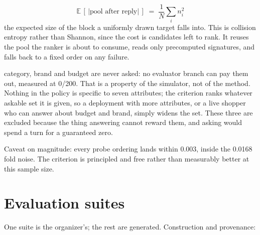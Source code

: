 \documentclass[11pt,a4paper]{article}
\newcommand{\code}[1]{{\ttfamily\small #1}}
\begin{document}
\[ \mathbb{E}\,[\,|\text{pool after reply}|\,] \;=\; \frac{1}{N}\sum_i n_i^{2} \]
the expected size of the block a uniformly drawn target falls into. This is collision entropy rather than Shannon, since the cost is candidates left to rank. It reuses the pool the ranker is about to consume, reads only precomputed signatures, and falls back to a fixed order on any failure.

\code{category}, \code{brand} and \code{budget} are never asked: no evaluator branch can pay them out, measured at 0/200. That is a property of the simulator, not of the method. Nothing in the policy is specific to seven attributes; the criterion ranks whatever askable set it is given, so a deployment with more attributes, or a live shopper who can answer about budget and brand, simply widens the set. These three are excluded because the thing answering cannot reward them, and asking would spend a turn for a guaranteed zero.

Caveat on magnitude: every probe ordering lands within 0.003, inside the 0.0168 fold noise. The criterion is principled and free rather than measurably better at this sample size.

\section{Evaluation suites}
One suite is the organizer's; the rest are generated. Construction and provenance:
\end{document}

